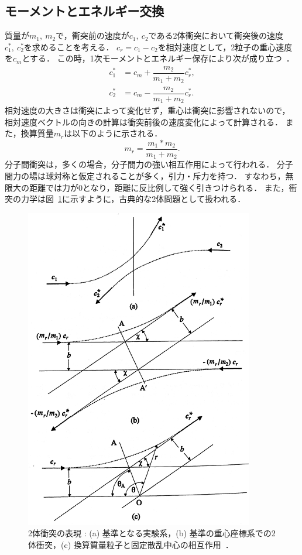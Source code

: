 \subsection{モーメントとエネルギー交換}
質量が$m_1,\ m_2$で，衝突前の速度が$c_1,\ c_2$である2体衝突において衝突後の速度$c_1^*,\ c_2^*$を求めることを考える．
$c_r = c_1 - c_2$を相対速度として，2粒子の重心速度を$c_m$とする．
この時，1次モーメントとエネルギー保存により次が成り立つ~\cite{bird1994molecular}．
\begin{align}
    c_1^* &= c_m + \dfrac{m_2}{m_1 + m_2}c_r^* , \\
    c_2^* &= c_m - \dfrac{m_2}{m_1 + m_2}c_r^* .
\end{align}
相対速度の大きさは衝突によって変化せず，重心は衝突に影響されないので，
相対速度ベクトルの向きの計算は衝突前後の速度変化によって計算される．
また，換算質量$m_r$は以下のように示される．
\begin{equation}
    m_r = \dfrac{m_1 * m_2}{m_1 + m_2}.
\end{equation}
分子間衝突は，多くの場合，分子間力の強い相互作用によって行われる．
分子間力の場は球対称と仮定されることが多く，引力・斥力を持つ．
すなわち，無限大の距離では力が0となり，距離に反比例して強く引きつけられる．
また，衝突の力学は図~\ref{fig:bird1}に示すように，古典的な2体問題として扱われる．

\begin{figure}
    \centering
    \includegraphics[width=10cm]{fig/dsmc/bird1.jpg}
    \caption{2体衝突の表現 : (a) 基準となる実験系，(b) 基準の重心座標系での2体衝突，(c) 換算質量粒子と固定散乱中心の相互作用~\cite{bird1994molecular}．}
    \label{fig:bird1}
\end{figure}

